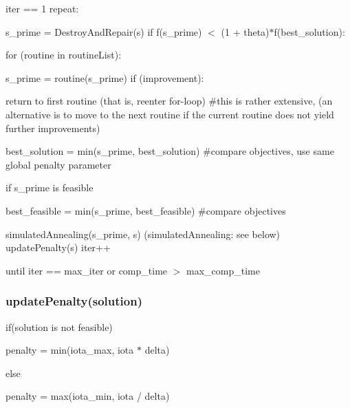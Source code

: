 {\ttfamily iter == 1} repeat\+:
\begin{DoxyItemize}
\item {\ttfamily s\+\_\+prime} = Destroy\+And\+Repair(s) if f({\ttfamily s\+\_\+prime}) $<$ (1 + theta)$\ast$f({\ttfamily best\+\_\+solution})\+:
\begin{DoxyItemize}
\item for (routine in routine\+List)\+:
\begin{DoxyItemize}
\item {\ttfamily s\+\_\+prime} = routine({\ttfamily s\+\_\+prime}) if (improvement)\+:
\begin{DoxyItemize}
\item return to first routine (that is, reenter for-\/loop) \#this is rather extensive, (an alternative is to move to the next routine if the current routine does not yield further improvements)
\end{DoxyItemize}
\end{DoxyItemize}
\end{DoxyItemize}

{\ttfamily best\+\_\+solution} = min({\ttfamily s\+\_\+prime}, {\ttfamily best\+\_\+solution}) \#compare objectives, use same global penalty parameter

if {\ttfamily s\+\_\+prime} is feasible
\begin{DoxyItemize}
\item {\ttfamily best\+\_\+feasible} = min({\ttfamily s\+\_\+prime}, {\ttfamily best\+\_\+feasible}) \#compare objectives
\end{DoxyItemize}

simulated\+Annealing({\ttfamily s\+\_\+prime, s}) (simulated\+Annealing\+: see below) update\+Penalty({\ttfamily s}) {\ttfamily iter++}
\end{DoxyItemize}

until {\ttfamily iter == max\+\_\+iter} or comp\+\_\+time $>$ max\+\_\+comp\+\_\+time

\subsubsection*{update\+Penalty(solution)}

if(solution is not feasible)
\begin{DoxyItemize}
\item penalty = min(iota\+\_\+max, iota $\ast$ delta)
\end{DoxyItemize}

else
\begin{DoxyItemize}
\item penalty = max(iota\+\_\+min, iota / delta)
\end{DoxyItemize}

